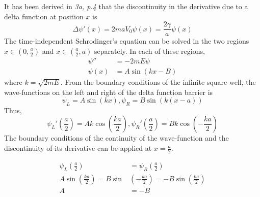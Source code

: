 \begin{sol}
It has been derived in \textit{3a, p.4} that the discontinuity in the derivative due to a delta function at position $x$ is 
\begin{equation}
    \Delta\psi'(x)=2maV_0\psi(x)=\frac{2\gamma}{a}\psi(x)
\end{equation}
The time-independent Schrodinger's equation can be solved in the two regions $x\in(0,\frac{a}{2})$ and $x\in(\frac{a}{2},a)$ separately. In each of these regions,
\begin{align}
    \psi''&=-2mE\psi\\
    \psi(x)&=A\sin(kx-B)
\end{align}
where $k=\sqrt{2mE}$. From the boundary conditions of the infinite square well, the wave-functions on the left and right of the delta function barrier is
\begin{equation}
    \psi_L=A\sin(kx), \psi_R=B\sin(k(x-a))
\end{equation}
Thus,
\begin{equation}
    \psi_L'\left(\frac{a}{2}\right)=Ak\cos\left(\frac{ka}{2}\right),\psi_R'\left(\frac{a}{2}\right)=Bk\cos\left(-\frac{ka}{2}\right)
\end{equation}
The boundary conditions of the continuity of the wave-function and the discontinuity of its derivative can be applied at $x=\frac{a}{2}$.

\begin{align}
    \psi_L\left(\frac{a}{2}\right)&=\psi_R\left(\frac{a}{2}\right)\\
    A\sin\left(\frac{ka}{2}\right)=B\sin&\left(-\frac{ka}{2}\right)=-B\sin\left(\frac{ka}{2}\right)\\
    A&=-B
\end{align}


\end{sol}
